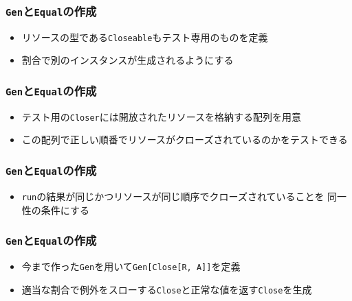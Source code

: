 \begin{frame}
  \frametitle{\protect\lstinline|Gen|と\protect\lstinline|Equal|の作成}

  
  

  \begin{itemize}
    \item<2-> リソースの型である\lstinline|Closeable|もテスト専用のものを定義
    \item<3-> 割合で別のインスタンスが生成されるようにする
  \end{itemize}
\end{frame}

\begin{frame}
  \frametitle{\protect\lstinline|Gen|と\protect\lstinline|Equal|の作成}

  
  

  \begin{itemize}
    \item<2-> テスト用の\lstinline|Closer|には開放されたリソースを格納する配列を用意
    \item<3-> この配列で正しい順番でリソースがクローズされているのかをテストできる
  \end{itemize}
\end{frame}

\begin{frame}
  \frametitle{\protect\lstinline|Gen|と\protect\lstinline|Equal|の作成}

  

  \begin{itemize}
    \item<2-> \lstinline|run|の結果が同じかつリソースが同じ順序でクローズされていることを
    同一性の条件にする
  \end{itemize}
\end{frame}

\begin{frame}
  \frametitle{\protect\lstinline|Gen|と\protect\lstinline|Equal|の作成}

  

  \begin{itemize}
    \item<2-> 今まで作った\lstinline|Gen|を用いて\lstinline|Gen[Close[R, A]]|を定義
    \item<3-> 適当な割合で例外をスローする\lstinline|Close|と正常な値を返す\lstinline|Close|を生成
  \end{itemize}
\end{frame}

